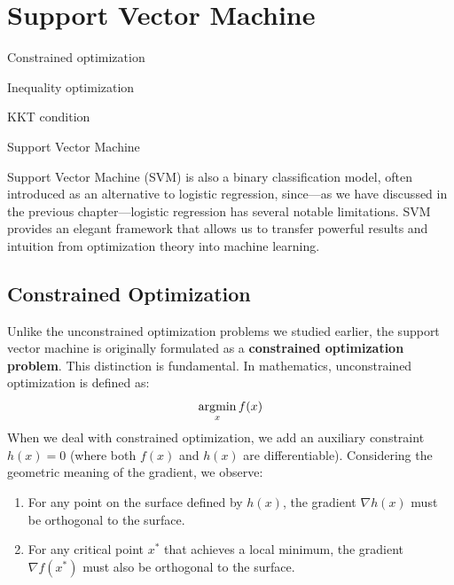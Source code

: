 \documentclass[../main]{subfiles}
\begin{document}
\chapter{Support Vector Machine}
\begin{introduction}
\item Constrained optimization
\item Inequality optimization
\item KKT condition
\item Support Vector Machine
\end{introduction}
Support Vector Machine (SVM) is also a binary classification model, often introduced as an alternative to logistic regression, since—as we have discussed in the previous chapter—logistic regression has several notable limitations. SVM provides an elegant framework that allows us to transfer powerful results and intuition from optimization theory into machine learning.
\section{Constrained Optimization}
Unlike the unconstrained optimization problems we studied earlier, the support vector machine is originally formulated as a \textbf{constrained optimization problem}. This distinction is fundamental. In mathematics, unconstrained optimization is defined as:
\begin{equation}
    \mathop{\mathrm{argmin}}_x f(x)
\end{equation}
When we deal with constrained optimization, we add an auxiliary constraint $h(x)=0$ (where both $f(x)$ and $h(x)$ are differentiable). Considering the geometric meaning of the gradient, we observe:

\begin{enumerate}
    \item For any point on the surface defined by $h(x)$, the gradient $\nabla h(x)$ must be orthogonal to the surface.
    \item For any critical point $x^*$ that achieves a local minimum, the gradient $\nabla f(x^*)$ must also be orthogonal to the surface.
\end{enumerate}
\end{document}
